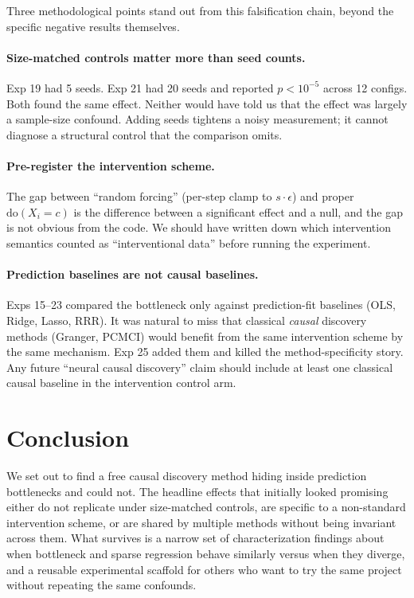\documentclass{article}
\begin{document}
Three methodological points stand out from this falsification chain,
beyond the specific negative results themselves.

\paragraph{Size-matched controls matter more than seed counts.}
Exp 19 had 5 seeds. Exp 21 had 20 seeds and reported $p < 10^{-5}$
across 12 configs. Both found the same effect. Neither would have
told us that the effect was largely a sample-size confound. Adding
seeds tightens a noisy measurement; it cannot diagnose a structural
control that the comparison omits.

\paragraph{Pre-register the intervention scheme.}
The gap between ``random forcing'' (per-step clamp to
$s \cdot \epsilon$) and proper $\text{do}(X_i = c)$ is the
difference between a significant effect and a null, and the gap is
not obvious from the code. We should have written down which
intervention semantics counted as ``interventional data'' before
running the experiment.

\paragraph{Prediction baselines are not causal baselines.}
Exps 15–23 compared the bottleneck only against prediction-fit
baselines (OLS, Ridge, Lasso, RRR). It was natural to miss that
classical \emph{causal} discovery methods (Granger, PCMCI) would
benefit from the same intervention scheme by the same mechanism.
Exp 25 added them and killed the method-specificity story. Any
future ``neural causal discovery'' claim should include at least
one classical causal baseline in the intervention control arm.

\section{Conclusion}

We set out to find a free causal discovery method hiding inside
prediction bottlenecks and could not. The headline effects that
initially looked promising either do not replicate under size-matched
controls, are specific to a non-standard intervention scheme, or are
shared by multiple methods without being invariant across them. What
survives is a narrow set of characterization findings about when
bottleneck and sparse regression behave similarly versus when they
diverge, and a reusable experimental scaffold for others who want to
try the same project without repeating the same confounds.
\end{document}
